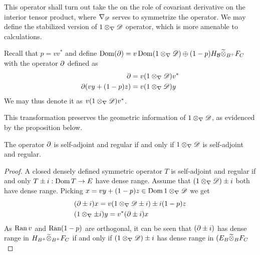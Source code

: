 This operator shall turn out take the on the role of covariant derivative on the interior tensor product, where $\nabla_{\mathscr{D}}$ serves to symmetrize the operator. 
	We may define the stabilized version of $1\otimes_\nabla \mathscr{D}$ operator, which is more amenable to calculations. 
\begin{definition}
	Recall that $p=vv^*$ and define $\operatorname{Dom} (\partial) = v\operatorname{Dom} (1\otimes_\nabla \mathscr{D})\oplus (1-p)H_{\mathcal{B}} \widetilde{\otimes}_{B^+} F_C$ with the operator $\partial$ defined as 
	\begin{align*} 
		\partial&=v(1\otimes_\nabla \mathscr{D})v^* \\
		\partial(vy+(1-p)z)&=v(1\otimes_\nabla \mathscr{D})y
	\end{align*}
	We may thus denote it as $v(1\otimes_\nabla \mathscr{D})v^*$. 
\end{definition}
This transformation preserves the geometric information of $1\otimes_\nabla \mathscr{D}$, as evidenced by the proposition below. 
\begin{lemma}\label{mesrennie313}
	The operator $\partial$ is self-adjoint and regular if and only if $1\otimes_\nabla \mathscr{D}$ is self-adjoint and regular. 
\end{lemma}
\begin{proof}
	A closed densely defined symmetric operator $T$ is self-adjoint and regular if and only $T\pm i:\operatorname{Dom} T\to E$ have dense range. Assume that $(1\otimes_\nabla \mathscr{D})\pm i$ both have dense range. Picking $x=vy+(1-p)z\in \operatorname{Dom} 1\otimes_\nabla \mathscr{D}$ we get 
	\begin{align*}
		&(\partial \pm i)x=v(1\otimes_\nabla \mathscr{D} \pm i)\pm i(1-p)z \\
		&(1\otimes_\nabla \pm i)y=v^*(\partial \pm i )x
	\end{align*}
	As $\operatorname{Ran} v$ and $\operatorname{Ran} (1-p)$ are orthogonal, it can be seen that $(\partial \pm i)$ has dense range in $H_{B^+}\widetilde{\otimes}_{B^+} F_C$ if and only if $(1\otimes_\nabla \mathscr{D})\pm i$ has dense range in $(E_B \widetilde{\otimes}_B F_C$
\end{proof}
